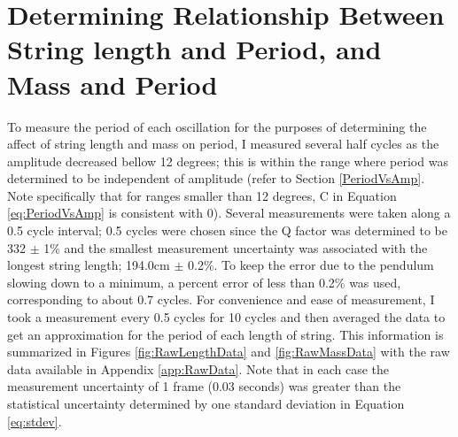 \documentclass[11pt]{article}
\begin{document}
    \section{Determining Relationship Between String length and Period, and Mass and Period}\label{sec:Lab4Main}
    To measure the period of each oscillation for the purposes of determining the affect of string length and mass on period, I measured several half cycles as the amplitude decreased bellow 12 degrees; this is within the range where period was determined to be independent of amplitude (refer to Section \ref{PeriodVsAmp}. Note specifically that for ranges smaller than 12 degrees, C in Equation \ref{eq:PeriodVsAmp} is consistent with 0). Several measurements were taken along a 0.5 cycle interval; 0.5 cycles were chosen since the Q factor was determined to be 332 $\pm$ 1\% and the smallest measurement uncertainty was associated with the longest string length; 194.0cm $\pm$ 0.2\%. To keep the error due to the pendulum slowing down to a minimum, a percent error of less than 0.2\% was used, corresponding to about 0.7 cycles. For convenience and ease of measurement, I took a measurement every 0.5 cycles for 10 cycles and then averaged the data to get an approximation for the period of each length of string. This information is summarized in Figures \ref{fig:RawLengthData} and \ref{fig:RawMassData} with the raw data available in Appendix \ref{app:RawData}. Note that in each case the measurement uncertainty of 1 frame (0.03 seconds) was greater than the statistical uncertainty determined by one standard deviation in Equation \ref{eq:stdev}.
        
\end{document}
